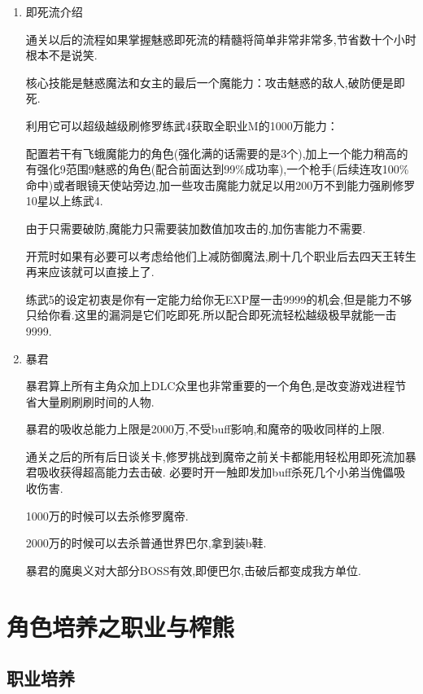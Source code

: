 \begin{enumerate}

	\item{即死流介绍}

	通关以后的流程如果掌握魅惑即死流的精髓将简单非常非常多,节省数十个小时根本不是说笑.

	核心技能是魅惑魔法和女主的最后一个魔能力：攻击魅惑的敌人,破防便是即死.

	利用它可以超级越级刷修罗练武4获取全职业M的1000万能力：

	配置若干有飞蛾魔能力的角色(强化满的话需要的是3个),加上一个能力稍高的有强化9范围9魅惑的角色(配合前面达到99\%成功率),一个枪手(后续连攻100\%命中)或者眼镜天使站旁边,加一些攻击魔能力就足以用200万不到能力强刷修罗10星以上练武4.

	由于只需要破防,魔能力只需要装加数值加攻击的,加伤害能力不需要.

	开荒时如果有必要可以考虑给他们上减防御魔法,刷十几个职业后去四天王转生再来应该就可以直接上了.

	练武5的设定初衷是你有一定能力给你无EXP屋一击9999的机会,但是能力不够只给你看.这里的漏洞是它们吃即死.所以配合即死流轻松越级极早就能一击9999.


	\item{暴君}

	暴君算上所有主角众加上DLC众里也非常重要的一个角色,是改变游戏进程节省大量刷刷刷时间的人物.

	暴君的吸收总能力上限是2000万,不受buff影响,和魔帝的吸收同样的上限.

	通关之后的所有后日谈关卡,修罗挑战到魔帝之前关卡都能用轻松用即死流加暴君吸收获得超高能力去击破.
	必要时开一触即发加buff杀死几个小弟当傀儡吸收伤害.

	1000万的时候可以去杀修罗魔帝.

	2000万的时候可以去杀普通世界巴尔,拿到装b鞋.

	暴君的魔奥义对大部分BOSS有效,即便巴尔,击破后都变成我方单位.


\end{enumerate}

\newpage

\section{角色培养之职业与榨熊}

	\subsection{职业培养}

